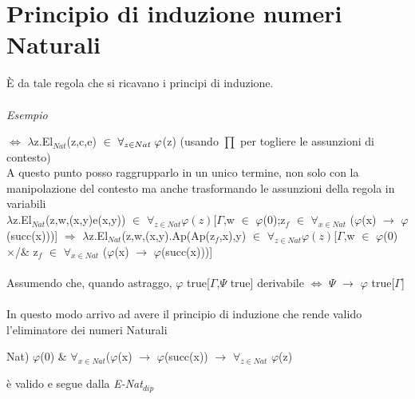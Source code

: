 \section{Principio di induzione numeri Naturali}
\label{sec:principio-di-induzione-numeri-Naturali}
\begin{prooftree}
\end{prooftree}
\noindent
\`E da tale regola che si ricavano i principi di induzione.\\\\
\noindent
\textit{Esempio}
\begin{prooftree}
\end{prooftree}
\noindent
$\Leftrightarrow$ $\lambda$z.El$_{Nat}$(z,c,e) $\in$ $\forall_{z \in Nat} \hspace{0.1cm}\varphi$(z) (usando {\scriptsize $\prod$} per togliere le assunzioni di contesto)\\
A questo punto posso raggrupparlo in un unico termine, non solo con la manipolazione del contesto ma anche trasformando le assunzioni della regola in variabili\\
$\lambda$z.El$_{Nat}$(z,w,(x,y)e(x,y)) $\in$ $\forall_{z \in Nat} \varphi(z)$[$\Gamma$,w $\in$ $\varphi$(0);z$_f$ $\in$ $\forall_{x \in Nat}$ ($\varphi$(x) $\rightarrow$ $\varphi$(succ(x)))] $\Rightarrow$
$\lambda$z.El$_{Nat}$(z,w,(x,y).Ap(Ap(z$_f$,x),y) $\in$ $\forall_{z \in Nat} \varphi(z)$[$\Gamma$,w $\in$ $\varphi$(0) $\times$/$\&$ z$_f$ $\in$ $\forall_{x \in Nat}$ ($\varphi$(x) $\rightarrow$ $\varphi$(succ(x)))]\\\\
\noindent
Assumendo che, quando astraggo, $\varphi$ true[$\Gamma$,$\Psi$ true] derivabile $\Leftrightarrow$ $\Psi$ $\rightarrow$ $\varphi$ true[$\Gamma$]\\\\
\noindent
In questo modo arrivo ad avere il principio di induzione che rende valido l'eliminatore dei numeri Naturali\\
\begin{center}Nat) $\varphi$(0) $\&$ $\forall_{x \in Nat}$($\varphi$(x) $\rightarrow$ $\varphi$(succ(x)) $\rightarrow$ $\forall_{z \in Nat}$ $\varphi$(z)\end{center}
\`e valido e segue dalla \textit{E-Nat$_{dip}$}

